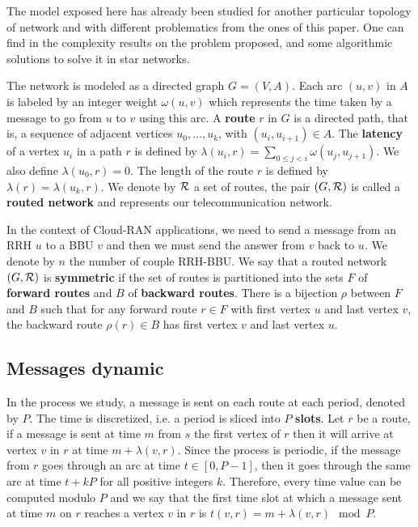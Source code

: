 \documentclass[a4paper,10pt,french,english]{article}
\begin{document}
The model exposed here has already been studied for another particular topology of network and with different problematics from the ones of this paper. One can find in \cite{latency2017} the complexity results on the problem proposed, and some algorithmic solutions to solve it in star networks.

The network is modeled as a directed graph $G=(V,A)$. Each arc  $(u,v)$ in $A$ is labeled by an integer weight $\omega(u,v)$ which represents the time taken by a message to go from $u$ to $v$ using this arc. A {\bf route} $r$ in $G$ is a directed path, that is, a sequence of adjacent vertices $u_0, \ldots , u_{k}$, with $(u_i,u_{i+1}) \in A$.  The {\bf latency} of a vertex $u_i$ in a path $r$ is defined by $\lambda(u_i,r)= \sum\limits_{0 \leq j <i} \omega(u_j, u_{j+1})$. We also define $\lambda(u_0,r)=0$. The length of the route $r$ is defined by $\lambda (r)= \lambda (u_k,r)$.
We denote by $\cal R$ a set of routes, the pair $(G,\cal R)$ is called a {\bf routed network} and represents our telecommunication network.

   In the context of Cloud-RAN applications, we need to send a message from an RRH $u$ to a BBU $v$ and then 
      we must send the answer from $v$ back to $u$. We denote by $n$ the number of couple RRH-BBU. We say that a routed network $(G, {\cal R})$ is \textbf{symmetric} if the set of routes is partitioned into the sets $F$ of \textbf{forward routes} and $B$ of \textbf{backward routes}. There is a bijection $\rho$ between $F$ and $B$ such that for any forward route $r \in F$ with first vertex $u$ and last vertex $v$, the backward route $\rho(r) \in B$ has first vertex $v$ and last vertex $u$. 
       
 
\subsection{Messages dynamic}
      
      In the process we study, a message is sent on each route at each period, denoted by $P$. The time is discretized, i.e. a period is sliced into $P$ {\bf slots}. 
      Let $r$ be a route, if a message is sent at time $m$ from $s$ the first vertex of $r$ then it will arrive at vertex $v$ in $r$ at time $m + \lambda(v,r)$. Since the process is periodic, if the message from $r$ goes through an arc at time $t\in [0,P-1]$, then it goes through the same arc at time $t+kP$ for all positive integers $k$. Therefore, every time value can be computed modulo $P$ and we say that the first time slot at which a message sent at time $m$ on $r$ reaches a vertex $v$ in $r$ is $t(v,r) = m + \lambda(v,r)\mod P$. 
      
\end{document}
